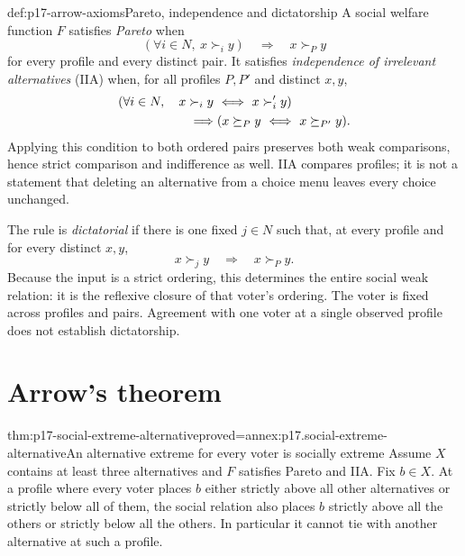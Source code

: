 \begin{hbdefinition}{def:p17-arrow-axioms}{Pareto, independence and dictatorship}
A social welfare function \(F\) satisfies \emph{Pareto} when
\[
 (\forall i\in N,\ x\succ_i y)\quad\Longrightarrow\quad x\succ_Py
\]
for every profile and every distinct pair.
It satisfies \emph{independence of irrelevant alternatives} (IIA) when,
for all profiles \(P,P'\) and distinct \(x,y\),
\[
 \begin{split}
 &(\forall i\in N,\quad x\succ_i y\ \Longleftrightarrow\ x\succ'_i y)\\
 &\hspace{20mm}\Longrightarrow
       (x\succeq_Py\ \Longleftrightarrow\ x\succeq_{P'}y).
 \end{split}
\]
Applying this condition to both ordered pairs preserves both weak
comparisons, hence strict comparison and indifference as well.
IIA compares profiles; it is not a statement that deleting an alternative
from a choice menu leaves every choice unchanged.

The rule is \emph{dictatorial} if there is one fixed \(j\in N\) such that,
at every profile and for every distinct \(x,y\),
\[
                    x\succ_jy\quad\Longrightarrow\quad x\succ_Py.
\]
Because the input is a strict ordering, this determines the entire social
weak relation: it is the reflexive closure of that voter's ordering.
The voter is fixed across profiles and pairs. Agreement with one voter
at a single observed profile does not establish dictatorship.
\end{hbdefinition}

\section{Arrow's theorem}
\label{sec:p17-arrow-theorem}

\begin{hblemma}{thm:p17-social-extreme-alternative}{proved=annex:p17.social-extreme-alternative}{An alternative extreme for every voter is socially extreme}
Assume \(X\) contains at least three alternatives and \(F\) satisfies
Pareto and IIA. Fix \(b\in X\). At a profile where every voter places
\(b\) either strictly above all other alternatives or strictly below all
of them, the social relation also places \(b\) strictly above all the
others or strictly below all the others. In particular it cannot tie with
another alternative at such a profile.
\end{hblemma}

